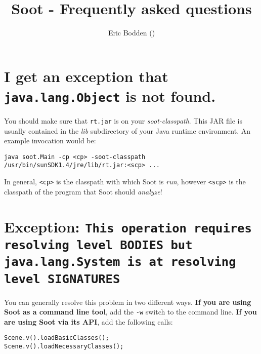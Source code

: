 \documentclass{article}
\title{Soot - Frequently asked questions}
\author{Eric Bodden (\htmladdnormallink{ebodde@sable.mcgill.ca}{mailto:ebodde@sable.mcgill.ca})}
\begin{document}
\maketitle

\tableofcontents

\newpage


\section{I get an exception that \texttt{java.lang.Object} is not found.}
You should make sure that \texttt{rt.jar} is on your \textit{soot-classpath}.
This JAR file is usually contained in the \textit{lib} subdirectory of your Java
runtime environment. An example invocation would be:

\begin{verbatim}
java soot.Main -cp <cp> -soot-classpath /usr/bin/sunSDK1.4/jre/lib/rt.jar:<scp> ...
\end{verbatim}

In general, \verb$<cp>$ is the classpath with which Soot is \textit{run}, however
\verb$<scp>$ is the classpath of the program that Soot should \textit{analyze}!

\section[Exception: \texttt{This operation requires resolving level BODIES...}]
{Exception: \texttt{This operation requires resolving level BODIES but java.lang.System is at resolving level SIGNATURES}}

You can generally resolve this problem in two different ways.
\textbf{If you are using Soot as a command line tool}, add the \texttt{-w} switch
to the command line. \textbf{If you are using Soot via its API}, add the
following calls:

\begin{verbatim}
Scene.v().loadBasicClasses();
Scene.v().loadNecessaryClasses();
\end{verbatim}
\end{document}
